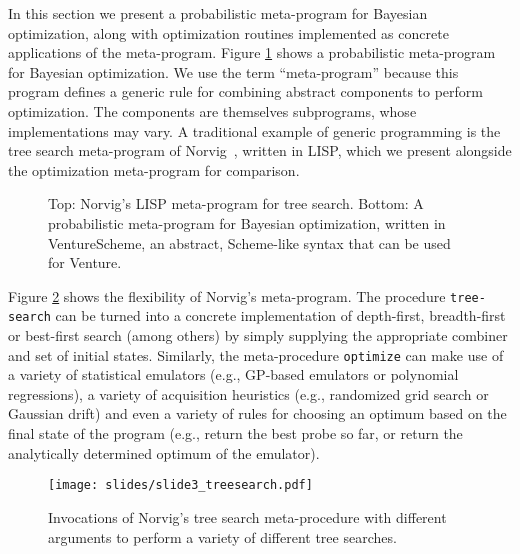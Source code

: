 In this section we present a probabilistic meta-program for Bayesian
optimization, along with optimization routines implemented as concrete
applications of the meta-program.  Figure \ref{fig:slide3-definitions} shows a probabilistic meta-program for
Bayesian optimization.  We use the term ``meta-program'' because this program
defines a generic rule for combining abstract components to perform
optimization.  The components are themselves subprograms, whose implementations
may vary.  A traditional example of generic programming is the tree search
meta-program of Norvig~\cite{norvig1992paradigms}, written in LISP, which we present
alongside the optimization meta-program for comparison.

\begin{figure}[p]
  \begin{minipage}{\linewidth}
    
    
  \end{minipage}
  \caption{
    Top: Norvig's LISP meta-program for tree search.
    Bottom: A probabilistic meta-program for Bayesian optimization, written in
    VentureScheme, an abstract, Scheme-like syntax that can be used for Venture.
  }
  \label{fig:slide3-definitions}
\end{figure}

Figure \ref{fig:slide3-tree-search} shows the flexibility of Norvig's
meta-program.  The procedure \texttt{tree-search} can be turned into a concrete
implementation of depth-first, breadth-first or best-first search (among others)
by simply supplying the appropriate combiner and set of initial states.
Similarly, the meta-procedure \texttt{optimize} can make use of a variety of
statistical emulators (e.g., GP-based emulators or polynomial regressions), a
variety of acquisition heuristics (e.g., randomized grid search or Gaussian
drift) and even a variety of rules for choosing an optimum based on the final
state of the program (e.g., return the best probe so far, or return the
analytically determined optimum of the emulator). 

\begin{figure}
  \centering
  \texttt{[image: slides/slide3\_treesearch.pdf]}
  \caption{
    Invocations of Norvig's tree search meta-procedure with different arguments
    to perform a variety of different tree searches.
  }
  \label{fig:slide3-tree-search}
\end{figure}



